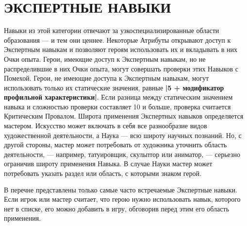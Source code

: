 \section{ЭКСПЕРТНЫЕ НАВЫКИ}
Навыки из этой категории отвечают за узкоспециализированные области образования — и тем они ценнее. Некоторые Атрибуты открывают доступ к Экспертным навыкам и позволяют героям использовать их и вкладывать в них Очки опыта.
\newline
Герои, имеющие доступ к Экспертным навыкам, но не распределившие в них Очки опыта, могут совершать проверки этих Навыков с Помехой. Герои, не имеющие доступа к Экспертным навыкам, могут использовать только их статические значения, равные \textbf{|5 + модификатор профильной характеристики|}. Если разница между статическим значением навыка и сложностью проверки составляет 10 и больше, проверка считается Критическим Провалом.
\newline
Широта применения Экспертных навыков определяется мастером. Искусство может включать в себя все разнообразие видов художественной деятельности, а Наука — всю широту научных познаний. Но, с другой стороны, мастер может потребовать от художника уточнить область деятельности, — например, татуировщик, скульптор или аниматор, — серьезно ограничив широту применения Навыка. В случае Науки мастер может потребовать указать раздел или область, с которыми знаком герой.
\begin{tcolorbox}
В перечне представлены только самые часто встречаемые Экспертные навыки. Если игрок или мастер считает, что герою нужно использовать навык, которого нет в списке, его можно добавить в игру, обговорив перед этим его область применения.
\end{tcolorbox}


